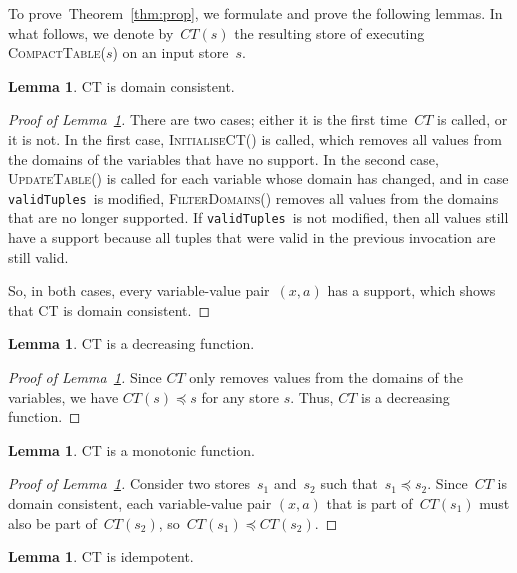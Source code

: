 \documentclass[a4paper,11pt]{article}
\theoremstyle{definition}
\newtheorem{lemma}[theorem]{Lemma}
\newcommand{\Thmref}[1]{Theorem~\ref{#1}}
\newcommand{\Lemmaref}[1]{Lemma~\ref{#1}}
\newcommand{\CurrTable}{\texttt{validTuples}}
\def\CompactTable{\textsc{Compact\-Table}}
\def\UpdateTable{\textsc{Update\-Table}}
\def\FilterDomains{\textsc{Filter\-Domains}}
\def\InitialiseCT{\textsc{Initialise\-CT}}
\numberwithin{equation}{section}
\begin{document}
To prove~\Thmref{thm:prop}, we formulate and prove the following lemmas.
In what follows, we denote by~$CT(s)$ the resulting store of executing
\CompactTable($s$) on an input store~$s$.

\begin{lemma}\label{lemma:domain-consistent}
  CT is domain consistent.
\end{lemma}

\begin{proof}[Proof of \Lemmaref{lemma:domain-consistent}]
  There are two cases; either it is the first time~$CT$ is called, or it
  is not.
  In the first case, \InitialiseCT() is called, which removes all values
  from the domains of the variables that have no support.
  In the second case, \UpdateTable() is called for each variable whose
  domain has changed, and in case \CurrTable~is modified, \FilterDomains()
  removes all values from the domains that are no longer supported.
  If \CurrTable~is not modified, then all values still have a support because
  all tuples that were valid in the previous invocation are still valid.

  So, in both cases, every variable-value pair~$(x,a)$ has a support,
  which shows that CT is domain consistent.
\end{proof}

\begin{lemma} \label{lemma:decreasing}
  CT is a decreasing function.
\end{lemma}

\begin{proof}[Proof of \Lemmaref{lemma:decreasing}]
  Since $CT$ only removes values from
  the domains of the variables, we have $CT(s) \preceq s$ for any store $s$.
  Thus, $CT$ is a decreasing function.
\end{proof}

\begin{lemma}\label{lemma:monotonic}
  CT is a monotonic function.
\end{lemma}

\begin{proof}[Proof of \Lemmaref{lemma:monotonic}]
  Consider two stores~$s_1$ and~$s_2$ such that~$s_1 \preceq s_2$.
  Since~$CT$ is domain consistent, each variable-value pair $(x,a)$
  that is part of~$CT(s_1)$ must also be part of~$CT(s_2)$,
  so~$CT(s_1) \preceq CT(s_2)$.
\end{proof}


\begin{lemma}\label{lemma:idempotent}
  CT is idempotent.
\end{lemma}
\end{document}
